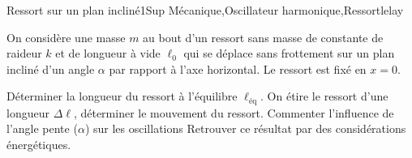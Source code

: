 
\begin{exercise}{Ressort sur un plan incliné}{1}{Sup}
{Mécanique,Oscillateur harmonique,Ressort}{lelay}

On considère une masse $m$ au bout d'un ressort sans masse de constante de raideur $k$ et de longueur à vide $\ell_0$ qui se déplace sans frottement sur un plan incliné d'un angle $\alpha$ par rapport à l'axe horizontal. Le ressort est fixé en $x=0$.

\begin{questions}
    \question Déterminer la longueur du ressort  à l'équilibre $\ell_\text{éq}$.
    \question On étire le ressort d'une longueur $\Delta\ell$, déterminer le mouvement du ressort. Commenter l'influence de l'angle pente ($\alpha$) sur les oscillations
    \question Retrouver ce résultat par des considérations énergétiques.
\end{questions}
\end{exercise}